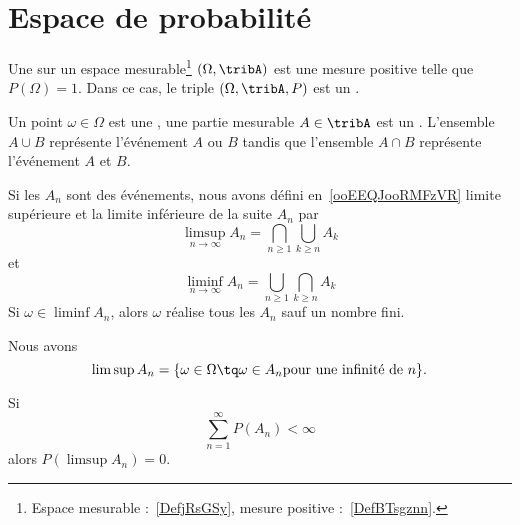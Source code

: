 
\section{Espace de probabilité}

\begin{definition}
	Une  sur un espace mesurable\footnote{Espace mesurable :~\ref{DefjRsGSy}, mesure positive :~\ref{DefBTsgznn}.} \( (\Omega,\tribA)\) est une mesure positive telle que \( P(\Omega)=1\). Dans ce cas, le triple \( (\Omega,\tribA,P)\) est un .
\end{definition}

Un point \( \omega\in\Omega\) est une , une partie mesurable \( A\in\tribA\) est un . L'ensemble \( A\cup B\) représente l'événement \( A\) ou \( B\) tandis que l'ensemble \( A\cap B\) représente l'événement \( A\) et \( B\).

Si les \( A_n\) sont des événements, nous avons défini en~\ref{ooEEQJooRMFzVR} limite supérieure et la limite inférieure de la suite \( A_n\) par
\begin{equation}
	\limsup_{n\to\infty}A_n=\bigcap_{n\geq 1}\bigcup_{k\geq n}A_k
\end{equation}
et
\begin{equation}
	\liminf_{n\to\infty}A_n=\bigcup_{n\geq 1}\bigcap_{k\geq n}A_k
\end{equation}
Si \( \omega\in\liminf A_n\), alors \( \omega\) réalise tous les \( A_n\) sauf un nombre fini.

Nous avons
\begin{equation}
	\limsup A_n=\{ \omega\in\Omega\tq \omega\in A_n\text{pour une infinité de } n \}.
\end{equation}

\begin{theorem}
	Si
	\begin{equation}
		\sum_{n=1}^{\infty}P(A_n)<\infty
	\end{equation}
	alors \( P(\limsup A_n)=0\).
\end{theorem}

